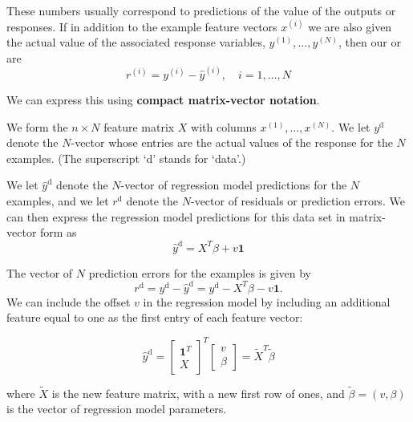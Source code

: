 These numbers usually correspond to predictions of the value of the outputs or responses. If in addition to the example feature vectors $ x^{(i)} $ we are also given the actual value of the associated response variables, $ y^{(1)}, \ldots, y^{(N)} $, then our  or  are
\begin{equation}
r^{(i)}=y^{(i)}-\hat{y}^{(i)}, \quad i=1, \ldots, N
\end{equation}

We can express this using \textbf{compact matrix-vector notation}. 

We form the $ n \times N $ feature matrix $ X $ with columns $ x^{(1)}, \ldots, x^{(N)} $. We let $ y^{\mathrm{d}} $ denote the $ N $-vector whose entries are the actual values of the response for the $ N $ examples. (The superscript `d' stands for `data'.) 

We let $ \hat{y}^{\mathrm{d}} $ denote the $ N $-vector of regression model predictions for the $ N $ examples, and we let $ r^{\mathrm{d}} $ denote the $ N $-vector of residuals or prediction errors. We can then express the regression model predictions for this data set in matrix-vector form as
\begin{equation}
\hat{y}^{\mathrm{d}}=X^{T} \beta+v \mathbf{1}
\end{equation}

The vector of $ N $ prediction errors for the examples is given by
\begin{equation}
r^{\mathrm{d}}=y^{\mathrm{d}}-\hat{y}^{\mathrm{d}}=y^{\mathrm{d}}-X^{T} \beta-v \mathbf{1} .
\end{equation}
We can include the offset $ v $ in the regression model by including an additional feature equal to one as the first entry of each feature vector:

\begin{problem}
    \begin{equation}
\hat{y}^{\mathrm{d}}=\left[\begin{array}{c}
\mathbf{1}^{T} \\
X
\end{array}\right]^{T}\left[\begin{array}{l}
v \\
\beta
\end{array}\right]=\tilde{X}^{T} \tilde{\beta}
\end{equation}

where $ \tilde{X} $ is the new feature matrix, with a new first row of ones, and $ \tilde{\beta}=(v, \beta) $ is the vector of regression model parameters.
\end{problem}

